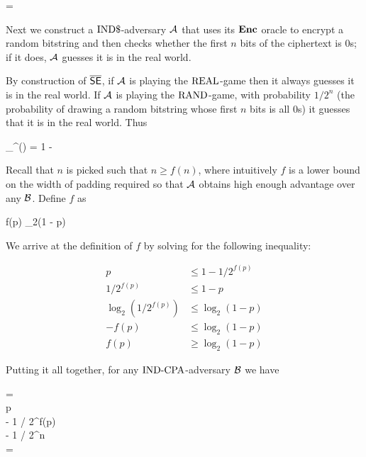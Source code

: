 \bnm
\AdvINDCPA{\overline{\SEscheme}}{\advB} = \AdvINDCPA{\SEscheme}{\advB}
\enm

Next we construct a $\textnormal{IND\$}$-adversary ${\mathcal A}$ that uses its $\textbf{Enc}$ oracle to
encrypt a random bitstring and then checks whether the first $n$ bits of the
ciphertext is 0s; if it does, ${\mathcal A}$ guesses it is in the real world.


By construction of $\overline{\textnormal{\textsf{SE}}}$, if ${\mathcal A}$ is playing the
$\textnormal{REAL}$-game then it always guesses it is in the real world.
If ${\mathcal A}$ is playing the $\textnormal{RAND}$-game, with probability $1 / 2^n$
(the probability of drawing a random bitstring whose first $n$ bits is all 0s)
it guesses that it is in the real world. Thus 

\bnm
\adv_{\overline{\SEscheme}}^{\INDRAND}(\advA) = 1 - 
\enm

Recall that $n$ is picked such that $n \geq f(n)$, where intuitively $f$ is a
lower bound on the width of padding required so that ${\mathcal A}$ obtains high enough
advantage over any ${\mathcal B}$. Define $f$ as

\bnm
f(p) \geq \log_2(1 - p)
\enm

We arrive at the definition of $f$ by solving for the following inequality:

\begin{align*}
  p &\leq 1 - 1 / 2^{f(p)} \\
  1 / 2^{f(p)} &\leq 1 - p \\
  \log_2(1 / 2^{f(p)}) &\leq \log_2(1 - p) \\
  - f(p) &\leq \log_2(1 - p) \\
  f(p) &\geq \log_2(1 - p)
\end{align*}

Putting it all together, for any $\textnormal{IND-CPA}$-adversary ${\mathcal B}$ we have

\bnm
  \AdvINDCPA{\overline{\SEscheme}}{\INDCPA}{\advB}
  = \AdvINDCPA{\SEscheme}{\advB} \\
  \leq p \\
   - 1 / 2^{f(p)} \\
   - 1 / 2^n \\
  = \AdvROR{\overline{\SEscheme}}{\advA}
\enm

